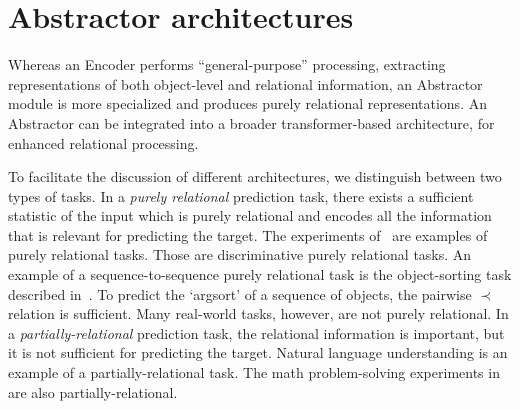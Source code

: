 \section{Abstractor architectures}\label{sec:abstractor_architectures}


Whereas an Encoder performs ``general-purpose'' processing, extracting representations of both object-level and relational information, an Abstractor module is more specialized and produces purely relational representations. An Abstractor can be integrated into a broader transformer-based architecture, for enhanced relational processing.

To facilitate the discussion of different architectures, we distinguish between two types of tasks. In a \textit{purely relational} prediction task, there exists a sufficient statistic of the input which is purely relational and encodes all the information that is relevant for predicting the target. The experiments of~\citep{esbn,kerg2022neural} are examples of purely relational tasks. Those are discriminative purely relational tasks. An example of a sequence-to-sequence purely relational task is the object-sorting task described in~. To predict the `argsort' of a sequence of objects, the pairwise $\prec$ relation is sufficient. Many real-world tasks, however, are not purely relational. In a \textit{partially-relational} prediction task, the relational information is important, but it is not sufficient for predicting the target. Natural language understanding is an example of a partially-relational task. The math problem-solving experiments in~ are also partially-relational.

